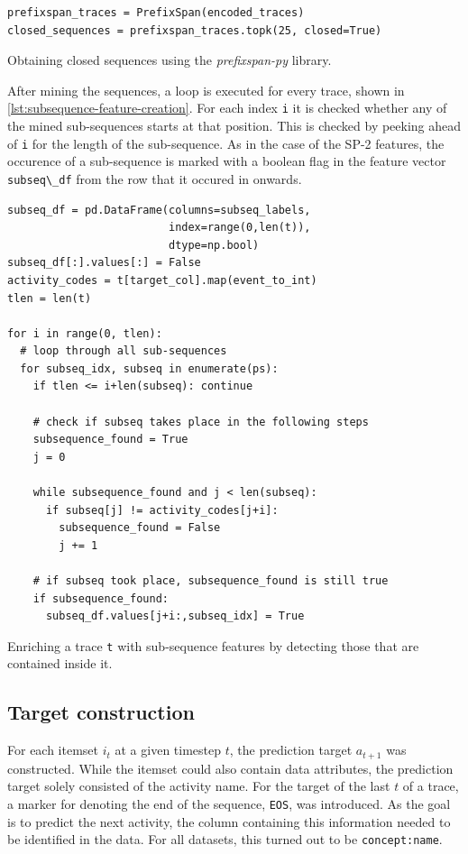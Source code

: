 \begin{listing}[ht]
\begin{verbatim}
prefixspan_traces = PrefixSpan(encoded_traces)
closed_sequences = prefixspan_traces.topk(25, closed=True)
\end{verbatim}
\caption{Obtaining closed sequences using the \textit{prefixspan-py} library.}
\label{lst:pfs-mining}
\end{listing}

After mining the sequences, a loop is executed for every trace, shown in \autoref{lst:subsequence-feature-creation}. For each index \verb=i= it is checked whether any of the mined sub-sequences starts at that position. This is checked by peeking ahead of \verb=i= for the length of the sub-sequence. As in the case of the SP-2 features, the occurence of a sub-sequence is marked with a boolean flag in the feature vector \verb=subseq\_df= from the row that it occured in onwards.

\begin{listing}[ht]
\begin{verbatim}
subseq_df = pd.DataFrame(columns=subseq_labels,
                         index=range(0,len(t)),
                         dtype=np.bool)
subseq_df[:].values[:] = False
activity_codes = t[target_col].map(event_to_int)
tlen = len(t)

for i in range(0, tlen):
  # loop through all sub-sequences
  for subseq_idx, subseq in enumerate(ps):
    if tlen <= i+len(subseq): continue

    # check if subseq takes place in the following steps
    subsequence_found = True
    j = 0

    while subsequence_found and j < len(subseq):
      if subseq[j] != activity_codes[j+i]:
        subsequence_found = False
        j += 1

    # if subseq took place, subsequence_found is still true
    if subsequence_found:
      subseq_df.values[j+i:,subseq_idx] = True
\end{verbatim}
\caption{Enriching a trace \texttt{t} with sub-sequence features by detecting those that are contained inside it.}
\label{lst:subsequence-feature-creation}
\end{listing}

\subsection*{Target construction}
For each itemset $i_t$ at a given timestep $t$, the prediction target $a_{t+1}$ was constructed. While the itemset could also contain data attributes, the prediction target solely consisted of the activity name. For the target of the last $t$ of a trace, a marker for denoting the end of the sequence, \verb=EOS=, was introduced.
As the goal is to predict the next activity, the column containing this information needed to be identified in the data. For all datasets, this turned out to be \verb=concept:name=.

